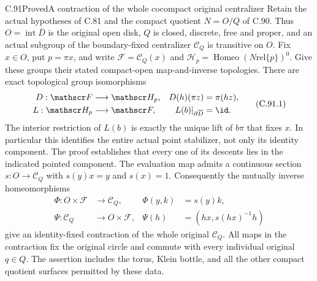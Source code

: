\begin{claim}{C.91}{Proved}{A contraction of the whole cocompact original centralizer}
Retain the actual hypotheses of C.81 and the compact quotient
$N=O/Q$ of C.90.  Thus $O=\operatorname{int}\overline D$ is
the original open disk, $Q$ is closed, discrete, free and proper,
and an actual subgroup of the boundary-fixed centralizer
$\mathscr C_Q$ is transitive on $O$.
Fix $x\in O$, put $p=\pi x$, and write
$\mathscr F=\mathscr C_Q(x)$ and
$\mathscr H_p=\operatorname{Homeo}(N\mathbin{\mathrm{rel}}\{p\})^0$.
Give these groups their stated compact-open map-and-inverse
topologies.  There are exact topological group isomorphisms
\[
 \begin{aligned}
 D:\mathscr F&\longrightarrow\mathscr H_p,
       &D(h)(\pi z)&=\pi(hz),\\
 L:\mathscr H_p&\longrightarrow\mathscr F,
       &L(b)|_{\partial\overline D}&=\id.
 \end{aligned}                                                    \tag{C.91.1}
\]
The interior restriction of $L(b)$ is exactly the unique
lift of $b\pi$ that fixes $x$.
In particular this identifies the entire actual point stabilizer,
not only its identity component.  The proof establishes that every
one of its descents lies in the indicated pointed component.
The evaluation map admits a continuous section
$s:O\to\mathscr C_Q$ with $s(y)x=y$ and $s(x)=1$.
Consequently the mutually inverse homeomorphisms
\[
 \begin{aligned}
 \Phi:O\times\mathscr F&\longrightarrow\mathscr C_Q,
       &\Phi(y,k)&=s(y)k,\\
 \Psi:\mathscr C_Q&\longrightarrow O\times\mathscr F,
       &\Psi(h)&=(hx,s(hx)^{-1}h)
 \end{aligned}                                                    \tag{C.91.2}
\]
give an identity-fixed contraction of the whole original
$\mathscr C_Q$.  All maps in the contraction fix the original
circle and commute with every individual original $q\in Q$.
The assertion includes the torus, Klein bottle, and all the
other compact quotient surfaces permitted by these data.

\end{claim}

